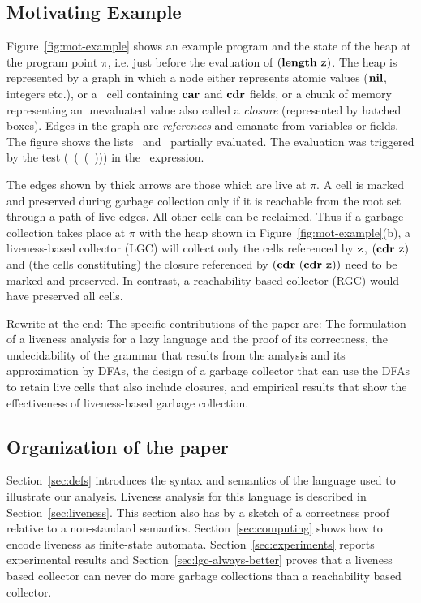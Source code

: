 \documentclass[9pt]{sigplanconf}
\begin{document}
\subsection{Motivating Example}
\label{sec:motiv}

Figure~\ref{fig:mot-example} shows an example program and the state of
the heap at the program point $\pi$, i.e. just before the  evaluation
of $(\length\ \pz)$.  The heap is represented by a graph in which
a node  either represents atomic values ($\mbox{$\mathbf{ nil}$}$,  integers etc.), or
a \CONS\  cell  containing $\mbox{$\mathbf{car}$}$  and  $\mbox{$\mathbf{cdr}$}$  fields, or a chunk of
memory representing an unevaluated
value  also called a  {\em closure}  (represented by  hatched boxes).
Edges in the graph are  {\em references} and emanate from variables or
fields.  The figure shows the lists \px\ and \pz\ partially evaluated.
The evaluation was triggered by the test (\NULLQ~(\CAR~(\CDR~\pz))) in
the \SIF\ expression.


The edges shown by thick arrows  are those which are live at $\pi$.  A
cell is marked  and preserved during garbage collection  only if it is
reachable from the  root set through a path of  live edges.  All other
cells can be  reclaimed.  Thus if a garbage  collection takes place at
$\pi$  with  the  heap  shown  in  Figure~\ref{fig:mot-example}(b),  a
liveness-based collector (LGC) will  collect only the cells referenced
by  $\mbox{\tt z}$, $(\mbox{$\mathbf{cdr}$}~  \mbox{\tt z})$  and (the  cells  constituting) the  closure
referenced by $(\mbox{$\mathbf{cdr}$}~(\mbox{$\mathbf{cdr}$}~\mbox{\tt z}))$ need to be marked and preserved.  In
contrast,  a reachability-based collector  (RGC) would  have preserved
all cells.

{\color {Myblue}Rewrite at the end: The  specific contributions of the
paper
  are: The formulation of a  liveness analysis for a lazy language and
  the proof of its correctness, the undecidability of the grammar that
  results from the analysis and  its approximation by DFAs, the design
  of a  garbage collector that can  use the DFAs to  retain live cells
  that  also include  closures, and  empirical results  that  show the
  effectiveness of liveness-based garbage collection.}

\subsection{Organization of the paper}

Section~\ref{sec:defs} introduces the syntax and semantics of the
language used to illustrate our
analysis.
Liveness analysis for this language is  described in
Section~\ref{sec:liveness}. This section also has by  a  sketch  of  a
correctness proof  relative  to  a  non-standard
semantics.  Section~\ref{sec:computing}  shows how to  encode liveness
as   finite-state  automata.    Section~\ref{sec:experiments}  reports
experimental  results  and Section~\ref{sec:lgc-always-better}  proves
that a liveness based collector  can never do more garbage collections
than a reachability based collector.
\end{document}
